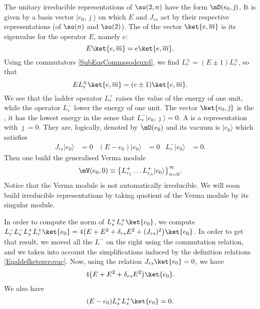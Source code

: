 The unitary irreducible representations of $\so(2,n)$ have the form $\mD(e_0,\bar\jmath)$. It is given by a basis vector $| e_0,\bar\jmath \rangle$ on which $E$ and $J_{rs}$ act by their respective representations (of $\so(n)$ and $\so(2)$). The  of the vector $\ket{e,\overline{ m }}$ is its eigenvalue for the operator $E$, namely $e$:
\begin{equation}
	E\ket{e,\overline{ m }}=e\ket{e,\overline{ m }}.
\end{equation}
Using the commutators \eqref{SubEqsCommssodeuxd}, we find $L_r^{\pm}=(E\pm 1)L_r^{\pm}$, so that
\begin{equation}
	E L^{\pm}_r\ket{e,\overline{ m }} =(e\pm 1)\ket{e,\overline{ m }}.
\end{equation}
We see that the ladder operator $L_r^+$ raises the value of the energy of one unit, while the operator $L_r^-$ lower the energy of one unit. The vector $\ket{e_0,\bar\jmath}$ is the , it has the lowest energy in the sense that $L^{-}_r| e_0,\jmath \rangle=0$. A  is a representation with $\bar\jmath=0$. They are, logically, denoted by $\mD(e_0)$ and its vacuum is $| e_0 \rangle$ which satisfies
\begin{align}		\label{Eqaldefketezerovac}
	J_{rs}| e_0 \rangle & = 0	& (E-e_0)| e_0 \rangle&=0	&L_r^{-}| e_0 \rangle&=0.
\end{align}
Then one build the generalised Verma module
\begin{equation}	\label{EqmVVermaldots}
	\mV(e_0,0)\equiv \big\{   L_{r_1}^+\ldots L_{r_n}^+| e_0 \rangle   \big\}_{n=0}^{\infty}.
\end{equation}
Notice that the Verma module is not automatically irreducible. We will soon build irreducible representations by taking quotient of the Verma module by its singular module.

In order to compute the norm of $L_s^+L_r^+\ket{e_0}$, we compute $L^-_rL^-_sL^+_sL^+_r\ket{e_0} =4\big(E+E^2+\delta_{rs}E^2+(J_{rs})^2\big)\ket{e_0}$. In order to get that result, we moved all the $L^-$ on the right using the commutation relation, and we taken into account the simplifications induced by the definition relations \eqref{Eqaldefketezerovac}. Now, using the relation $J_{rs}\ket{e_0}=0$, we have
\begin{equation}
	4\big(E+E^2+\delta_{rs}E^2\big)\ket{e_0}.
\end{equation} We also have
\begin{equation}
	(E-e_0)L^+_sL^+_s\ket{e_0}=0.
\end{equation}

